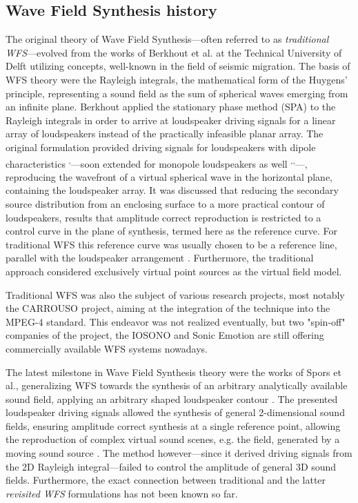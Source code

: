 \documentclass[10pt,twoside]{article}
\theoremstyle{thesisgroupstyle}
\theoremstyle{indented}
\begin{document}
\subsection{Wave Field Synthesis history}
%
The original theory of Wave Field Synthesis---often referred to as \emph{traditional WFS}---evolved from the works of Berkhout et al. at the Technical University of Delft utilizing concepts, well-known in the field of seismic migration.%
The basis of WFS theory were the Rayleigh integrals, the mathematical form of the Huygens' principle, representing a sound field as the sum of spherical waves emerging from an infinite plane.
Berkhout applied the stationary phase method (SPA) to the Rayleigh integrals in order to arrive at loudspeaker driving signals for a linear array of loudspeakers instead of the practically infeasible planar array.
The original formulation provided driving signals for loudspeakers with dipole characteristics \textsuperscript{,}---soon extended for monopole loudspeakers as well \textsuperscript{,}\textsuperscript{,}---, reproducing the wavefront of a virtual spherical wave in the horizontal plane, containing the loudspeaker array.
It was discussed that reducing the secondary source distribution from an enclosing surface to a more practical contour of loudspeakers, results that amplitude correct reproduction is restricted to a control curve in the plane of synthesis, termed here as the reference curve.
For traditional WFS this reference curve was usually chosen to be a reference line, parallel with the loudspeaker arrangement .
Furthermore, the traditional approach considered exclusively virtual point sources as the virtual field model.

Traditional WFS was also the subject of various research projects, most notably the CARROUSO project, aiming at the integration of the technique into the MPEG-4 standard. This endeavor was not realized eventually, but two "spin-off" companies of the project, the IOSONO and Sonic Emotion are still offering commercially available WFS systems nowadays.

The latest milestone in Wave Field Synthesis theory were the works of Spors et al., generalizing WFS towards the synthesis of an arbitrary analytically available sound field, applying an arbitrary shaped loudspeaker contour .
The presented loudspeaker driving signals allowed the synthesis of general 2-dimensional sound fields, ensuring amplitude correct synthesis at a single reference point,
allowing the reproduction of complex virtual sound scenes, e.g. the field, generated by a moving sound source .
The method however---since it derived driving signals from the 2D Rayleigh integral---failed to control the amplitude of general 3D sound fields.
Furthermore, the exact connection between traditional and the latter \emph{revisited WFS} formulations has not been known so far.
\end{document}
